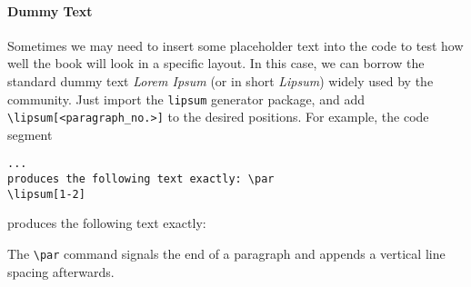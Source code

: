 \paragraph{Dummy Text}
Sometimes we may need to insert some placeholder text into the code to test how well the book will look in a specific layout. In this case, we can borrow the standard dummy text \textit{Lorem Ipsum} (or in short \textit{Lipsum}) widely used by the community. Just import the \verb|lipsum| generator package, and add \texttt{\textbackslash lipsum[<paragraph\_no.>]} to the desired positions. For example, the code segment
\begin{lstlisting}
...
produces the following text exactly: \par
\lipsum[1-2]
\end{lstlisting}
produces the following text exactly: \par
\lipsum[1-2] \par
The \texttt{\textbackslash par} command signals the end of a paragraph and appends a vertical line spacing afterwards. 